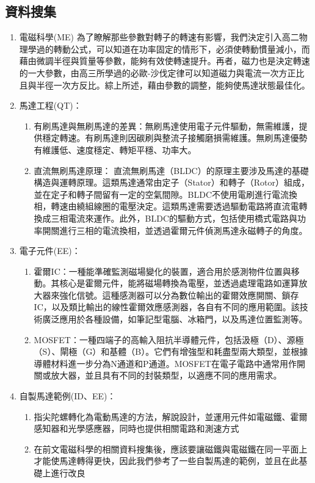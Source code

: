 \documentclass[12pt,a4paper]{article}
\begin{document}
\begin{CJK*}{UTF8}{bkai}
    \subsection{資料搜集}
    \begin{enumerate}
        \item 電磁科學(ME)
              \subitem 為了瞭解那些參數對轉子的轉速有影響，我們決定引入高二物理學過的轉動公式，可以知道在功率固定的情形下，必須使轉動慣量減小，而藉由微調半徑與質量等參數，能夠有效使轉速提升。再者，磁力也是決定轉速的一大參數，由高三所學過的必歐-沙伐定律可以知道磁力與電流一次方正比且與半徑一次方反比。綜上所述，藉由參數的調整，能夠使馬達狀態最佳化。
        \item 馬達工程(QT)：
              \begin{enumerate}
                  \item 有刷馬達與無刷馬達的差異：無刷馬達使用電子元件驅動，無需維護，提供穩定轉速。有刷馬達則因碳刷與整流子接觸磨損需維護。無刷馬達優勢有維護低、速度穩定、轉矩平穩、功率大。 \cite{whatBLDC}
                  \item 直流無刷馬達原理： 直流無刷馬達（BLDC）的原理主要涉及馬達的基礎構造與運轉原理。這類馬達通常由定子（Stator）和轉子（Rotor）組成，並在定子和轉子間留有一定的空氣間隙。BLDC不使用電刷進行電流換相，轉速由繞組線圈的電壓決定。這類馬達需要透過驅動電路將直流電轉換成三相電流來運作。此外，BLDC的驅動方式，包括使用橋式電路與功率開關進行三相的電流換相，並透過霍爾元件偵測馬達永磁轉子的角度。\cite{BLDCtheory1,BLDCtheory2}
              \end{enumerate}
        \item 電子元件(EE)：
              \begin{enumerate}
                  \item 霍爾IC：一種能準確監測磁場變化的裝置，適合用於感測物件位置與移動。其核心是霍爾元件，能將磁場轉換為電壓，並透過處理電路如運算放大器來強化信號。這種感測器可以分為數位輸出的霍爾效應開關、鎖存IC，以及類比輸出的線性霍爾效應感測器，各自有不同的應用範圍。該技術廣泛應用於各種設備，如筆記型電腦、冰箱門，以及馬達位置監測等。\cite{whatHall}
                  \item MOSFET：一種四端子的高輸入阻抗半導體元件，包括汲極（D）、源極（S）、閘極（G）和基體（B）。它們有增強型和耗盡型兩大類型，並根據導體材料進一步分為N通道和P通道。MOSFET在電子電路中通常用作開關或放大器，並且具有不同的封裝類型，以適應不同的應用需求。 \cite{whatMosfet}
              \end{enumerate}
        \item 自製馬達範例(ID、EE)：
              \begin{enumerate}
                  \item 指尖陀螺轉化為電動馬達的方法，解說設計，並運用元件如電磁鐵、霍爾感知器和光學感應器，同時也提供相關電路和測速方式 \cite{Fidget_Spinner_Motors}
                  \item 在前文電磁科學的相關資料搜集後，應該要讓磁鐵與電磁鐵在同一平面上才能使馬達轉得更快，因此我們參考了一些自製馬達的範例，並且在此基礎上進行改良 \cite{BLmoterVideo}
              \end{enumerate}
    \end{enumerate}

\end{CJK*}
\end{document}
